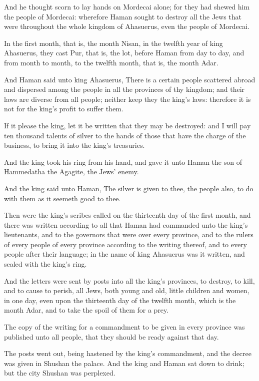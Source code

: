 \verse And he thought scorn to lay hands on Mordecai alone; for they had shewed him the people of Mordecai: wherefore Haman sought to destroy all the Jews that were throughout the whole kingdom of Ahasuerus, even the people of Mordecai.

\verse In the first month, that is, the month Nisan, in the twelfth year of king Ahasuerus, they cast Pur, that is, the lot, before Haman from day to day, and from month to month, to the twelfth month, that is, the month Adar.

\verse And Haman said unto king Ahasuerus, There is a certain people scattered abroad and dispersed among the people in all the provinces of thy kingdom; and their laws are diverse from all people; neither keep they the king's laws: therefore it is not for the king's profit to suffer them.

\verse If it please the king, let it be written that they may be destroyed: and I will pay ten thousand talents of silver to the hands of those that have the charge of the business, to bring it into the king's treasuries.

\verse And the king took his ring from his hand, and gave it unto Haman the son of Hammedatha the Agagite, the Jews' enemy.

\verse And the king said unto Haman, The silver is given to thee, the people also, to do with them as it seemeth good to thee.

\verse Then were the king's scribes called on the thirteenth day of the first month, and there was written according to all that Haman had commanded unto the king's lieutenants, and to the governors that were over every province, and to the rulers of every people of every province according to the writing thereof, and to every people after their language; in the name of king Ahasuerus was it written, and sealed with the king's ring.

\verse And the letters were sent by posts into all the king's provinces, to destroy, to kill, and to cause to perish, all Jews, both young and old, little children and women, in one day, even upon the thirteenth day of the twelfth month, which is the month Adar, and to take the spoil of them for a prey.

\verse The copy of the writing for a commandment to be given in every province was published unto all people, that they should be ready against that day.

\verse The posts went out, being hastened by the king's commandment, and the decree was given in Shushan the palace. And the king and Haman sat down to drink; but the city Shushan was perplexed.


